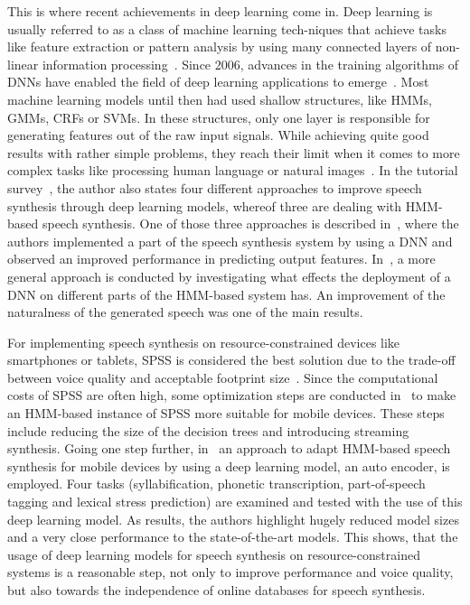 This is where recent achievements in deep learning come in. Deep learning is usually referred to as a class of machine learning  tech-\break niques that achieve tasks like feature extraction or pattern analysis by using many connected layers of non-linear information processing~\cite{ling:deep, li:survey}. Since 2006, advances in the training algorithms of \acp{DNN} have enabled the field of deep learning applications to emerge~\cite{boros:robust}. Most machine learning models until then had used shallow structures, like \acp{HMM}, \acp{GMM}, \acp{CRF} or \acp{SVM}. In these structures, only one layer is responsible for generating features out of the raw input signals. While achieving quite good results with rather simple problems, they reach their limit when it comes to more complex tasks like processing human language or natural images~\cite{li:survey}. In the tutorial survey~\cite{li:survey}, the author also states four different approaches to improve speech synthesis through deep learning models, whereof three are dealing with \ac{HMM}-based speech synthesis. One of those three approaches is described in~\cite{zen:deepstatistical}, where the authors implemented a part of the speech synthesis system by using a \ac{DNN} and observed an improved performance in predicting output features. In~\cite{hashimoto:effect}, a more general approach is conducted by investigating what effects the deployment of a \ac{DNN} on different parts of the \ac{HMM}-based system has. An improvement of the naturalness of the generated speech was one of the main results.

For implementing speech synthesis on resource-constrained devices like smartphones or tablets, \ac{SPSS} is considered the best solution due to the trade-off between voice quality and acceptable footprint size~\cite{toth:optimizing}. Since the computational costs of \ac{SPSS} are often high, some optimization steps are conducted in~\cite{toth:optimizing} to make an \ac{HMM}-based instance of \ac{SPSS} more suitable for mobile devices. These steps include reducing the size of the decision trees and introducing streaming synthesis. Going one step further, in~\cite{boros:robust} an approach to adapt \ac{HMM}-based speech synthesis for mobile devices by using a deep learning model, an auto encoder, is employed. Four tasks (syllabification, phonetic transcription, part-of-speech tagging and lexical stress prediction) are examined and tested with the use of this deep learning model. As results, the authors highlight hugely reduced model sizes and a very close performance to the state-of-the-art models. This shows, that the usage of deep learning models for speech synthesis on resource-constrained systems is a reasonable step, not only to improve performance and voice quality, but also towards the independence of online databases for speech synthesis.

